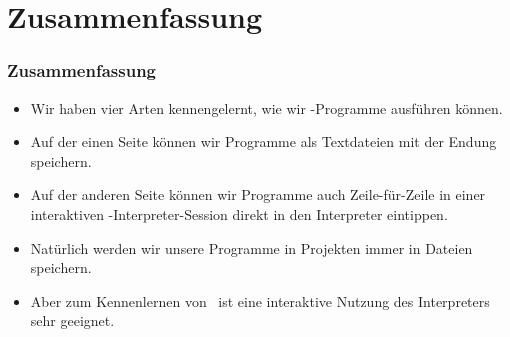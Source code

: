 \documentclass[aspectratio=169,mathserif,notheorems]{beamer}%
\begin{document}
\section{Zusammenfassung}%
%
\begin{frame}\frametitle{Zusammenfassung}%
\begin{itemize}%
\item Wir haben vier Arten kennengelernt, wie wir \python-Programme ausführen können.%
\item<2-> Auf der einen Seite können wir Programme als Textdateien mit der Endung~ speichern.%
\item<4-> Auf der anderen Seite können wir Programme auch Zeile-für-Zeile in einer interaktiven \python-Interpreter-Session direkt in den Interpreter eintippen.%
\item<5-> Natürlich werden wir unsere Programme in  Projekten immer in Dateien speichern.%
\item<6-> Aber zum Kennenlernen von \python\ ist eine interaktive Nutzung des Interpreters sehr geeignet\cite{PSF:P3D:TPT:AIITP}.%
\end{itemize}%
\end{frame}%
%
\endPresentation%
\end{document}
